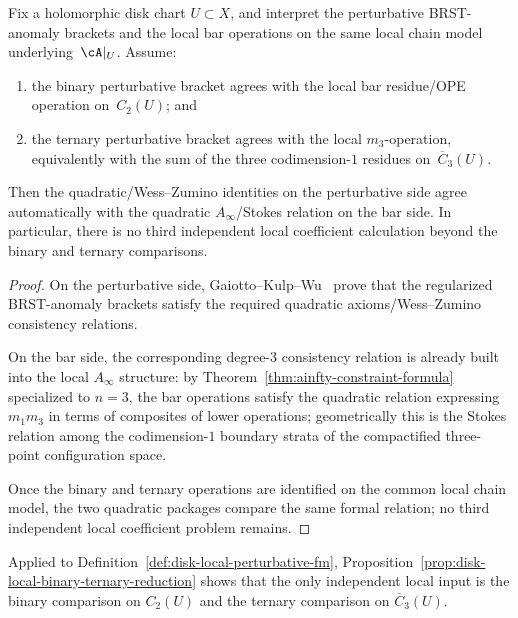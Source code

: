 \begin{proposition}
\label{prop:disk-local-binary-ternary-reduction}
Fix a holomorphic disk chart $U \subset X$, and interpret the
perturbative BRST-anomaly brackets and the local bar operations on the
same local chain model underlying~$\cA|_U$.
Assume:
\begin{enumerate}[label=\textup{(\roman*)}]
\item the binary perturbative bracket agrees with the local bar
 residue/OPE operation on~$C_2(U)$; and
\item the ternary perturbative bracket agrees with the local
 $m_3$-operation, equivalently with the sum of the three
 codimension-$1$ residues on~$\overline{C}_3(U)$.
\end{enumerate}
Then the quadratic/Wess--Zumino identities on the perturbative side
agree automatically with the quadratic $A_\infty$/Stokes relation on
the bar side. In particular, there is no third independent local
coefficient calculation beyond the binary and ternary comparisons.
\end{proposition}

\begin{proof}
On the perturbative side, Gaiotto--Kulp--Wu~\cite{GKW24} prove that the
regularized BRST-anomaly brackets satisfy the required quadratic
axioms/Wess--Zumino consistency relations.

On the bar side, the corresponding degree-$3$ consistency relation is
already built into the local $A_\infty$ structure: by
Theorem~\ref{thm:ainfty-constraint-formula} specialized to $n=3$, the
bar operations satisfy the quadratic relation expressing $m_1m_3$ in
terms of composites of lower operations; geometrically this is the
Stokes relation among the codimension-$1$ boundary strata of the
compactified three-point configuration space.

Once the binary and ternary operations are
identified on the common local chain model, the two quadratic packages
compare the same formal relation; no third
independent local coefficient problem remains.
\end{proof}

\begin{remark}
Applied to Definition~\ref{def:disk-local-perturbative-fm},
Proposition~\ref{prop:disk-local-binary-ternary-reduction} shows that
the only independent local input is the binary comparison on $C_2(U)$
and the ternary comparison on $\overline{C}_3(U)$.
\end{remark}

